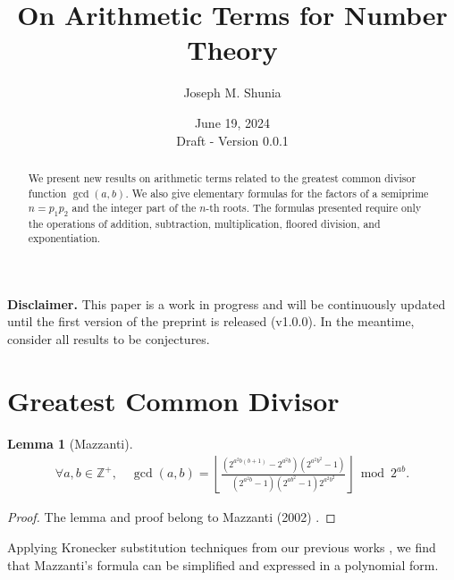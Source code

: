\documentclass[11pt,reqno]{article}
\title{On Arithmetic Terms for Number Theory}
\author{Joseph M. Shunia}
\date{June 19, 2024 \\ \small Draft - Version 0.0.1 \normalsize}
\theoremstyle{plain}
\newtheorem{lemma}[theorem]{Lemma}
\theoremstyle{definition}
\newcommand{\floor}[1]{\left\lfloor #1 \right\rfloor}
\newcommand{\Z}{\mathbb{Z}}
\begin{document}
\maketitle

\begin{abstract}
We present new results on arithmetic terms related to the greatest common divisor function $\gcd(a,b)$. We also give elementary formulas for the factors of a semiprime $n=p_1 p_2$ and the integer part of the $n$-th roots. The formulas presented require only the operations of addition, subtraction, multiplication, floored division, and exponentiation.
\end{abstract}

\textbf{Disclaimer.} This paper is a work in progress and will be continuously updated until the first version of the preprint is released (v1.0.0). In the meantime, consider all results to be conjectures.

\section{Greatest Common Divisor} \label{section:gcd}

\begin{lemma}[Mazzanti] \label{proof:mazzantigcd}
\begin{align*}
\forall a,b \in \Z^+, \quad
\gcd(a,b) = \floor{\frac{(2^{a^2 b(b+1)} - 2^{a^2 b}) (2^{a^2 b^2} - 1)}
         {(2^{a^2 b} - 1)(2^{ab^2}-1)2^{a^2 b^2}}} \bmod 2^{ab}.
\end{align*}
\end{lemma}
\begin{proof}
The lemma and proof belong to Mazzanti (2002) \cite{mazzanti2002plainbases}.
\end{proof}

Applying Kronecker substitution techniques from our previous works \cite{shunia2023simple, shunia2024polynomial}, we find that Mazzanti's formula can be simplified and expressed in a polynomial form.
\end{document}
